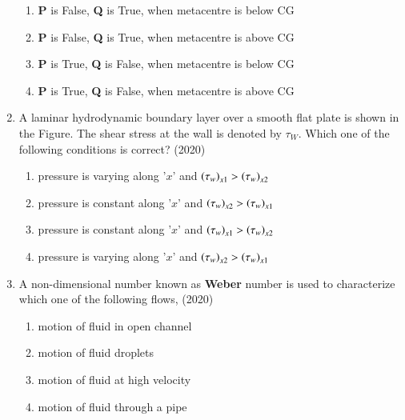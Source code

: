 \documentclass[journal]{IEEEtran}
\begin{document}
\begin{enumerate}
        \begin{enumerate}
            \item \textbf{P} is False, \textbf{Q} is True, when metacentre is below CG
            \item \textbf{P} is False, \textbf{Q} is True, when metacentre is above CG
            \item \textbf{P} is True, \textbf{Q} is False, when metacentre is below CG
            \item \textbf{P} is True, \textbf{Q} is False, when metacentre is above CG
        \end{enumerate}


    
    \item A laminar hydrodynamic boundary layer over a smooth flat plate is shown in the Figure. The shear stress at the wall is denoted by $\tau_W$. Which one of the following conditions is correct?
    \hfill{(2020)} 

    

    \begin{enumerate}
        \item pressure is varying along '$x$' and $\left(\tau_w\right)_{x1}>\left(\tau_w\right)_{x2}$
        \item pressure is constant along '$x$' and $\left(\tau_w\right)_{x2}>\left(\tau_w\right)_{x1}$
        \item pressure is constant along '$x$' and $\left(\tau_w\right)_{x1}>\left(\tau_w\right)_{x2}$
        \item pressure is varying along '$x$' and $\left(\tau_w\right)_{x2}>\left(\tau_w\right)_{x1}$
    \end{enumerate}



    
    \item A non-dimensional number known as \textbf{Weber} number is used to characterize which one of the following flows,
    \hfill{(2020)}
    
    \begin{multicols}{2}
    \begin{enumerate}
        \item motion of fluid in open channel
        \item motion of fluid droplets
        \item motion of fluid at high velocity
        \item motion of fluid through a pipe
    \end{enumerate}
    \end{multicols}


\end{enumerate}
\end{document}

